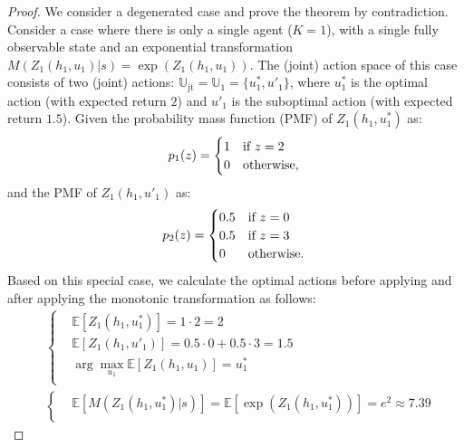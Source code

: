 \documentclass[twoside,11pt]{article}
\newcommand{\state}{s}
\newcommand{\jointactionspace}{\mathbb{U}}
\newcommand{\action}{u}
\newcommand{\observationhistory}{h}
\newcommand{\numberofagents}{K}
\newcommand{\utility}{Z}
\newcommand{\joint}{\mathrm{jt}}
\newcommand{\monotonicfunction}{M}
\newcounter{theorem0}
\begin{document}
\begin{proof}
We consider a degenerated case and prove the theorem by contradiction. Consider a case where there is only a single agent ($\numberofagents{}=1$), with a single fully observable state and an exponential transformation $\monotonicfunction{}(\utility{}_1(\observationhistory{}_1,\action{}_1)\vert\state)=\exp(\utility{}_1(\observationhistory{}_1,\action{}_1))$. The (joint) action space of this case consists of two (joint) actions: $\jointactionspace_{\joint}=\jointactionspace{}_1=\{\action{}^*_1, \action{}'_1\}$, where $\action{}^*_1$ is the optimal action (with expected return $2$) and $\action{}'_1$ is the suboptimal action (with expected return $1.5$). Given the probability mass function (PMF) of $\utility{}_1(\observationhistory{}_1,\action{}^*_1)$ as:
\begin{equation}
p_1(z)=\begin{cases}
1 &\text{if } z=2\\
0   &\text{otherwise},\\
\end{cases}
\notag{}
\end{equation}
and the PMF of $\utility{}_1(\observationhistory{}_1,\action{}'_1)$ as:
\begin{equation}
p_2(z)=\begin{cases}
0.5 &\text{if } z=0\\
0.5 &\text{if } z=3\\
0   &\text{otherwise}.\\
\end{cases}
\notag{}
\end{equation}
Based on this special case, we calculate the optimal actions before applying and after applying the monotonic transformation as follows:
\begin{equation}
\begin{split}
&\begin{cases}
&\mathbb{E}[\utility{}_1(\observationhistory{}_1,\action{}^*_1)]=1\cdot 2=2 \\
&\mathbb{E}[\utility{}_1(\observationhistory{}_1,\action{}'_1)]=0.5\cdot 0+0.5\cdot 3=1.5 \\
&\arg\max_{\action{}_1}\mathbb{E}[\utility{}_1(\observationhistory{}_1,\action{}_1)]=\action^*_1\\
\end{cases}\\
&\begin{cases}
&\mathbb{E}[\monotonicfunction{}(\utility{}_1(\observationhistory{}_1,\action{}^*_1)\vert\state)]=\mathbb{E}[\exp(\utility{}_1(\observationhistory{}_1,\action{}^*_1))]=e^2\approx 7.39 \\

\end{cases}
\end{split}
\end{equation}
\end{proof}
\end{document}
